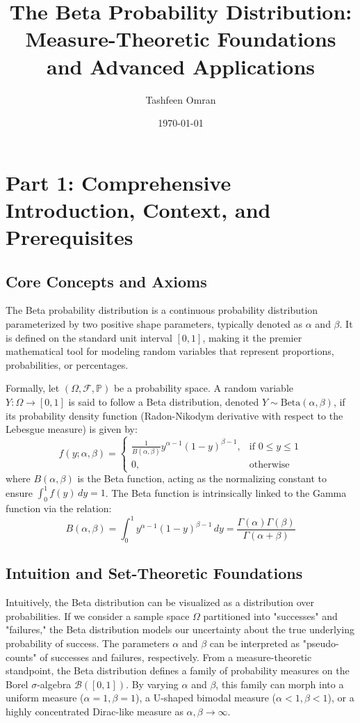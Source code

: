 \documentclass[11pt, a4paper]{article}
\theoremstyle{definition}
\theoremstyle{remark}
\newcommand{\Prob}{\mathbb{P}}
\newcommand{\F}{\mathcal{F}}
\begin{document}
\title{\textbf{The Beta Probability Distribution: Measure-Theoretic Foundations and Advanced Applications}}
\author{Tashfeen Omran}
\date{\today}

\maketitle
\tableofcontents
\newpage

\section{Part 1: Comprehensive Introduction, Context, and Prerequisites}

\subsection{Core Concepts and Axioms}
The Beta probability distribution is a continuous probability distribution parameterized by two positive shape parameters, typically denoted as $\alpha$ and $\beta$. It is defined on the standard unit interval $[0, 1]$, making it the premier mathematical tool for modeling random variables that represent proportions, probabilities, or percentages. 

Formally, let $(\Omega, \F, \Prob)$ be a probability space. A random variable $Y: \Omega \to [0,1]$ is said to follow a Beta distribution, denoted $Y \sim \text{Beta}(\alpha, \beta)$, if its probability density function (Radon-Nikodym derivative with respect to the Lebesgue measure) is given by:
\[
f(y; \alpha, \beta) = 
\begin{cases} 
\frac{1}{B(\alpha, \beta)} y^{\alpha-1}(1-y)^{\beta-1}, & \text{if } 0 \le y \le 1 \\
0, & \text{otherwise}
\end{cases}
\]
where $B(\alpha, \beta)$ is the Beta function, acting as the normalizing constant to ensure $\int_0^1 f(y) \, dy = 1$. The Beta function is intrinsically linked to the Gamma function via the relation:
\[
B(\alpha, \beta) = \int_0^1 y^{\alpha-1}(1-y)^{\beta-1} \, dy = \frac{\Gamma(\alpha)\Gamma(\beta)}{\Gamma(\alpha+\beta)}
\]

\subsection{Intuition and Set-Theoretic Foundations}
Intuitively, the Beta distribution can be visualized as a distribution over probabilities. If we consider a sample space $\Omega$ partitioned into "successes" and "failures," the Beta distribution models our uncertainty about the true underlying probability of success. The parameters $\alpha$ and $\beta$ can be interpreted as "pseudo-counts" of successes and failures, respectively. 
From a measure-theoretic standpoint, the Beta distribution defines a family of probability measures on the Borel $\sigma$-algebra $\mathcal{B}([0,1])$. By varying $\alpha$ and $\beta$, this family can morph into a uniform measure ($\alpha=1, \beta=1$), a U-shaped bimodal measure ($\alpha < 1, \beta < 1$), or a highly concentrated Dirac-like measure as $\alpha, \beta \to \infty$.
\end{document}
